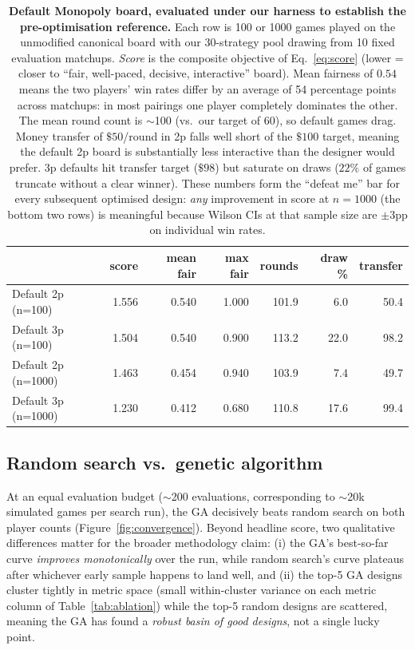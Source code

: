 \documentclass[10pt]{article}
\begin{document}
\begin{table}[h!]
\centering
\small
\begin{tabular}{lrrrrrr}
\toprule
                 & score & mean fair & max fair & rounds & draw \% & transfer \\
\midrule
Default 2p (n=100)   & 1.556 & 0.540 & 1.000 &  101.9 &  6.0 &  50.4 \\
Default 3p (n=100)   & 1.504 & 0.540 & 0.900 &  113.2 & 22.0 &  98.2 \\
Default 2p (n=1000)  & 1.463 & 0.454 & 0.940 &  103.9 &  7.4 &  49.7 \\
Default 3p (n=1000)  & 1.230 & 0.412 & 0.680 &  110.8 & 17.6 &  99.4 \\
\bottomrule
\end{tabular}
\caption{\textbf{Default Monopoly board, evaluated under our harness to
establish the pre-optimisation reference.} Each row is 100 or 1000 games
played on the unmodified canonical board with our 30-strategy pool
drawing from 10 fixed evaluation matchups. \emph{Score} is the composite
objective of Eq.~\ref{eq:score} (lower = closer to ``fair, well-paced,
decisive, interactive'' board). Mean fairness of $0.54$ means the two
players' win rates differ by an average of 54 percentage points across
matchups: in most pairings one player completely dominates the other.
The mean round count is $\sim$100 (vs.\ our target of 60), so default
games drag. Money transfer of $\$50$/round in 2p falls well short of the
$\$100$ target, meaning the default 2p board is substantially less
interactive than the designer would prefer. 3p defaults hit transfer
target ($\$98$) but saturate on draws ($22\%$ of games truncate without
a clear winner). These numbers form the ``defeat me'' bar for every
subsequent optimised design: \emph{any} improvement in score at
$n{=}1000$ (the bottom two rows) is meaningful because Wilson CIs at
that sample size are $\pm 3$pp on individual win rates.}
\label{tab:default}
\end{table}

\subsection{Random search vs.\ genetic algorithm}\label{sec:randvsga}

At an equal evaluation budget ($\sim$200 evaluations, corresponding to
$\sim$20k simulated games per search run), the GA decisively beats
random search on both player counts (Figure~\ref{fig:convergence}).
Beyond headline score, two qualitative differences matter for the
broader methodology claim: (i) the GA's best-so-far curve \emph{improves
monotonically} over the run, while random search's curve plateaus after
whichever early sample happens to land well, and (ii) the top-5 GA
designs cluster tightly in metric space (small within-cluster variance
on each metric column of Table~\ref{tab:ablation}) while the top-5
random designs are scattered, meaning the GA has found a \emph{robust
basin of good designs}, not a single lucky point.
\end{document}
